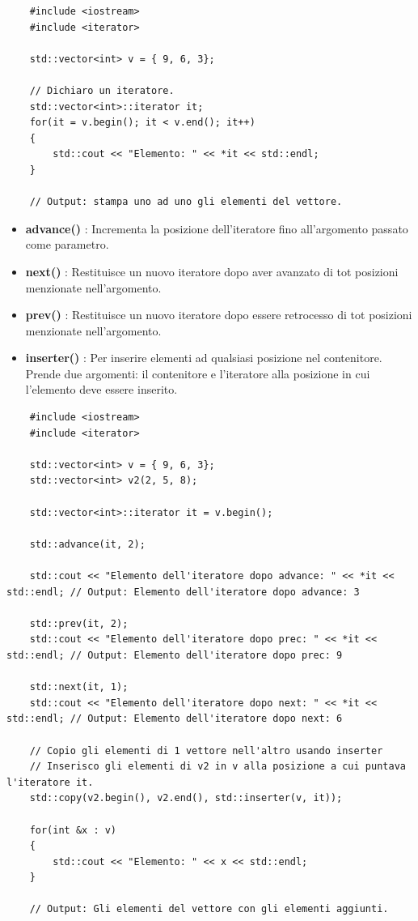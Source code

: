 \begin{lstlisting}
	#include <iostream>
	#include <iterator>
	
	std::vector<int> v = { 9, 6, 3};
	
	// Dichiaro un iteratore.
	std::vector<int>::iterator it;
	for(it = v.begin(); it < v.end(); it++)
	{
		std::cout << "Elemento: " << *it << std::endl;
	}

	// Output: stampa uno ad uno gli elementi del vettore.
\end{lstlisting}

\begin{itemize}
	\item \textsf{\small \textbf{advance()} : Incrementa la posizione dell'iteratore fino all'argomento passato come parametro.}
	\item \textsf{\small \textbf{next()} : Restituisce un nuovo iteratore dopo aver avanzato di tot posizioni menzionate nell'argomento.}
	\item \textsf{\small \textbf{prev()} : Restituisce un nuovo iteratore dopo essere retrocesso di tot posizioni menzionate nell'argomento.}
	\item \textsf{\small \textbf{inserter()} : Per inserire elementi ad qualsiasi posizione nel contenitore. Prende due argomenti: il contenitore e l'iteratore alla posizione in cui l'elemento deve essere inserito.}
\end{itemize}

\begin{lstlisting}
	#include <iostream>
	#include <iterator>
	
	std::vector<int> v = { 9, 6, 3};
	std::vector<int> v2(2, 5, 8);
	
	std::vector<int>::iterator it = v.begin();
	
	std::advance(it, 2);
	
	std::cout << "Elemento dell'iteratore dopo advance: " << *it << std::endl; // Output: Elemento dell'iteratore dopo advance: 3
	
	std::prev(it, 2);
	std::cout << "Elemento dell'iteratore dopo prec: " << *it << std::endl; // Output: Elemento dell'iteratore dopo prec: 9
	
	std::next(it, 1);
	std::cout << "Elemento dell'iteratore dopo next: " << *it << std::endl; // Output: Elemento dell'iteratore dopo next: 6
	
	// Copio gli elementi di 1 vettore nell'altro usando inserter
	// Inserisco gli elementi di v2 in v alla posizione a cui puntava l'iteratore it.
	std::copy(v2.begin(), v2.end(), std::inserter(v, it));
	
	for(int &x : v)
	{
		std::cout << "Elemento: " << x << std::endl;
	}

	// Output: Gli elementi del vettore con gli elementi aggiunti.
\end{lstlisting}

